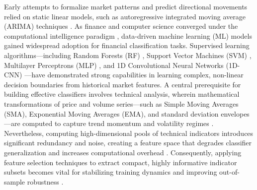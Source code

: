 Early attempts to formalize market patterns and predict directional movements relied on static linear models, such as autoregressive integrated moving average (ARIMA) techniques \cite{box2015time}. As finance and computer science converged under the computational intelligence paradigm \cite{jiang2021applications}, data-driven machine learning (ML) models gained widespread adoption for financial classification tasks. Supervised learning algorithms---including Random Forests (RF) \cite{nabipour2020predicting}, Support Vector Machines (SVM) \cite{naik2019optimal}, Multilayer Perceptrons (MLP) \cite{ecer2020mlp_ga_pso}, and 1D Convolutional Neural Networks (1D-CNN) \cite{bandgar2025finchronos}---have demonstrated strong capabilities in learning complex, non-linear decision boundaries from historical market features. A central prerequisite for building effective classifiers involves technical analysis, wherein mathematical transformations of price and volume series---such as Simple Moving Averages (SMA), Exponential Moving Averages (EMA), and standard deviation envelopes---are computed to capture trend momentum and volatility regimes \cite{billah2024nca_moving_average, hunter1986exponentially}. Nevertheless, computing high-dimensional pools of technical indicators introduces significant redundancy and noise, creating a feature space that degrades classifier generalization and increases computational overhead \cite{singh2022feature, lei2012feature}. Consequently, applying feature selection techniques to extract compact, highly informative indicator subsets becomes vital for stabilizing training dynamics and improving out-of-sample robustness \cite{kumar2014feature, souza2025iccsa}.

